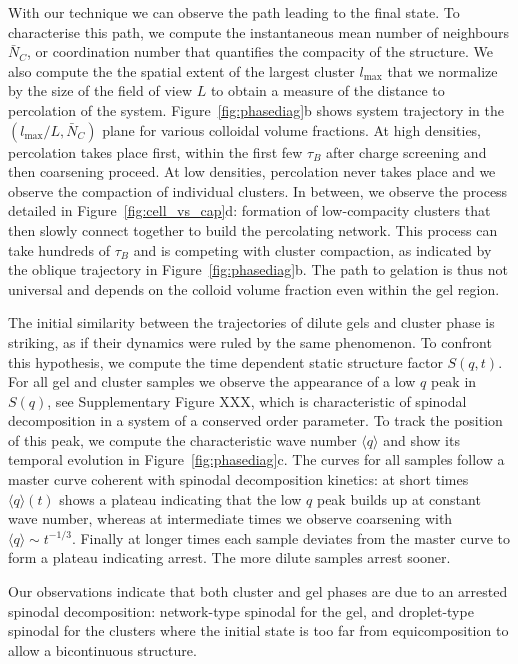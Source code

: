 With our technique we can observe the path leading to the final state. To characterise this path, we compute the instantaneous mean number of neighbours $\bar{N}_C$, or coordination number that quantifies the compacity of the structure. We also compute the the spatial extent of the largest cluster $l_\text{max}$ that we normalize by the size of the field of view $L$ to obtain a measure of the distance to percolation of the system. Figure~\ref{fig:phasediag}b shows system trajectory in the $(l_\text{max}/L, \bar{N}_C)$ plane for various colloidal volume fractions. At high densities, percolation takes place first, within the first few $\tau_B$ after charge screening and then coarsening proceed. At low densities, percolation never takes place and we observe the compaction of individual clusters. In between, we observe the process detailed in Figure~\ref{fig:cell_vs_cap}d: formation of low-compacity clusters that then slowly connect together to build the percolating network. This process can take hundreds of $\tau_B$ and is competing with cluster compaction, as indicated by the oblique trajectory in Figure~\ref{fig:phasediag}b. The path to gelation is thus not universal and depends on the colloid volume fraction even within the gel region.

The initial similarity between the trajectories of dilute gels and cluster phase is striking, as if their dynamics were ruled by the same phenomenon. To confront this hypothesis, we compute the time dependent static structure factor $S(q,t)$. For all gel and cluster samples we observe the appearance of a low $q$ peak in $S(q)$, see Supplementary Figure XXX, which is characteristic of spinodal decomposition in a system of a conserved order parameter. To track the position of this peak, we compute the characteristic wave number $\langle q \rangle$ and show its temporal evolution in Figure~\ref{fig:phasediag}c. The curves for all samples follow a master curve coherent with spinodal decomposition kinetics: at short times $\langle q \rangle(t)$ shows a plateau indicating that the low $q$ peak builds up at constant wave number, whereas at intermediate times we observe coarsening with $\langle q \rangle \sim t^{-1/3}$. Finally at longer times each sample deviates from the master curve to form a plateau indicating arrest. The more dilute samples arrest sooner.

Our observations indicate that both cluster and gel phases are due to an arrested spinodal decomposition: network-type spinodal for the gel, and droplet-type spinodal for the clusters where the initial state is too far from equicomposition to allow a bicontinuous structure.

